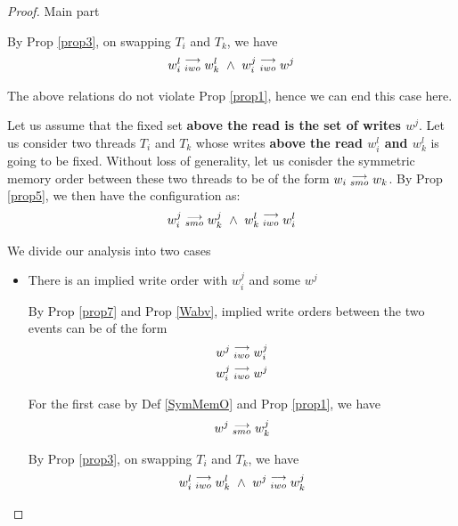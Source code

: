 \begin{proof}{Main part}
\begin{itemize}
                        By Prop \ref{prop3}, on swapping $T_i$ and $T_k$, we have 
                        \begin{align*}
                            \reln{w_i^l}{iwo}{w_k^l} \ \wedge \ \reln{w_i^j}{iwo}{w^j}
                        \end{align*}

                        The above relations do not violate Prop \ref{prop1}, hence we can end this case here. 
                \end{itemize}


                Let us assume that the fixed set \textbf{above the read is the set of writes $w^j$}. Let us consider two threads $T_i$ and $T_k$ whose writes \textbf{above the read $w_i^l$ and $w_k^l$} is going to be fixed. Without loss of generality, let us conisder the symmetric memory order between these two threads to be of the form $w_i\stackrel{\longrightarrow}{_{smo}}w_k$.  By Prop \ref{prop5}, we then have the configuration as:
                \begin{align*}
                    \reln{w_i^j}{smo}{w_k^j} \ \wedge \ \reln{w_k^l}{iwo}{w_i^l}
                \end{align*}

                We divide our analysis into two cases 
                \begin{itemize}
                    \item There is an implied write order with $w_i^j$ and some $w^j$

                        By Prop \ref{prop7} and Prop \ref{Wabv}, implied write orders between the two events can be of the form 
                        \begin{align*}
                            w^j\stackrel{\longrightarrow}{_{iwo}}w_i^j \\
                            w_i^j\stackrel{\longrightarrow}{_{iwo}}w^j 
                        \end{align*}

                        For the first case by Def \ref{SymMemO} and Prop \ref{prop1}, we have
                        \begin{align*}
                            w^j\stackrel{\longrightarrow}{_{smo}}w_k^j
                        \end{align*}

                        By Prop \ref{prop3}, on swapping $T_i$ and $T_k$, we have 
                        \begin{align*}
                            \reln{w_i^l}{iwo}{w_k^l} \ \wedge \ \reln{w^j}{iwo}{w_k^j}
                        \end{align*}


\end{itemize}
\end{proof}
